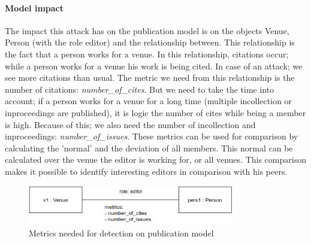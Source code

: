 \documentclass{ou-report}
\begin{document}
\paragraph{Model impact}
The impact this attack has on the publication model is on the objects Venue, 
Person (with the role editor) and the relationship between. This relationship is 
the fact that a person works for a venue. In this relationship, citations occur; 
while a person works for a venue his work is being cited. In case of an attack; 
we see more citations than usual. The metric we need from this 
relationship is the number of citations: \textit{number\_of\_cites}. But we need 
to take the time into account; if a person works for a venue for a long time 
(multiple incollection or inproceedings are published), it is logic the number 
of cites while being a member is high. Because of this; we also need the number 
of incollection and inproceedings: \textit{number\_of\_issues}.
These metrics can be used for comparison by calculating the 'normal' and the 
deviation of all members. This normal can be calculated over the venue the 
editor is working for, or all venues. This comparison makes it possible to 
identify interesting editors in comparison with his peers.

\begin{figure}[H]
\centering
\includegraphics[width=9cm]{images/cite_work_editorial_boardmodel_impact.drawio.png}
\caption{Metrics needed for detection on publication model}
\label{fig:cwebimpact}
\end{figure}

\end{document}
